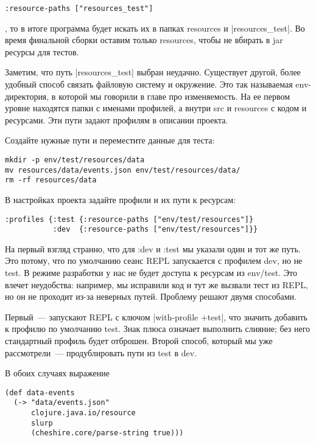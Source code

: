 \begin{verbatim}
:resource-paths ["resources_test"]
\end{verbatim}

, то в итоге программа будет искать их в папках resources и \spverb|resources_test|. Во
время финальной сборки оставим только resources, чтобы не вбирать в jar ресурсы
для тестов.

Заметим, что путь \spverb|resources_test| выбран неудачно. Существует другой, более
удобный способ связать файловую систему и окружение. Это так называемая
env-директория, в которой мы говорили в главе про изменяемость. На ее первом
уровне находятся папки с именами профилей, а внутри src и resources с кодом и
ресурсами. Эти пути задают профилям в описании проекта.

Создайте нужные пути и переместите данные для теста:

\begin{verbatim}
mkdir -p env/test/resources/data
mv resources/data/events.json env/test/resources/data/
rm -rf resources/data
\end{verbatim}

В настройках проекта задайте профили и их пути к ресурсам:

\begin{verbatim}
:profiles {:test {:resource-paths ["env/test/resources"]}
           :dev  {:resource-paths ["env/test/resources"]}}
\end{verbatim}

На первый взгляд странно, что для :dev и :test мы указали один и тот же
путь. Это потому, что по умолчанию сеанс REPL запускается с профилем dev, но не
test. В режиме разработки у нас не будет доступа к ресурсам из env/test. Это
влечет неудобства: например, мы исправили код и тут же вызвали тест из REPL, но
он не проходит из-за неверных путей. Проблему решают двумя способами.

Первый~--- запускают REPL с ключом \spverb|with-profile +test|, что значить добавить к
профилю по умолчанию test. Знак плюса означает выполнить слияние; без него
стандартный профиль будет отброшен. Второй способ, который мы уже рассмотрели~---
продублировать пути из test в dev.

В обоих случаях выражение

\begin{verbatim}
(def data-events
  (-> "data/events.json"
      clojure.java.io/resource
      slurp
      (cheshire.core/parse-string true)))
\end{verbatim}

